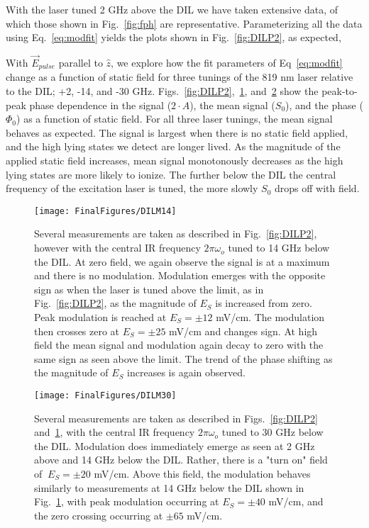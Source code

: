 \documentclass[aps,pra,preprint,groupedaddress]{revtex4-1}
\begin{document}
With the laser tuned 2 GHz above the DIL we have taken extensive data, of which those shown in Fig.~\ref{fig:fph} are representative. Parameterizing all the data using Eq.~\ref{eq:modfit} yields the plots shown in Fig.~\ref{fig:DILP2}, as expected, 

With $\vec{E}_{pulse}$ parallel to $\hat{z}$, we explore how the fit parameters of Eq~\ref{eq:modfit} change as a function of static field for three tunings of the 819 nm laser relative to the DIL; +2, -14, and -30 GHz. Figs.~\ref{fig:DILP2},~\ref{fig:DILM14}, and~\ref{fig:DILM30} show the peak-to-peak phase dependence in the signal ($2\cdot A$), the mean signal ($S_0$), and the phase ($\Phi_0$) as a function of static field. For all three laser tunings, the mean signal behaves as expected. The signal is largest when there is no static field applied, and the high lying states we detect are longer lived. As the magnitude of the applied static field increases, mean signal monotonously decreases as the high lying states are more likely to ionize. The further below the DIL the central frequency of the excitation laser is tuned, the more slowly $S_0$ drops off with field.

\begin{figure}
	\texttt{[image: FinalFigures/DILM14]}
	\caption{Several measurements are taken as described in Fig.~\ref{fig:DILP2}, however with the central IR frequency $2\pi\omega_o$ tuned to 14 GHz below the DIL. At zero field, we again observe the signal is at a maximum and there is no modulation. Modulation emerges with the opposite sign as when the laser is tuned above the limit, as in Fig.~\ref{fig:DILP2}, as the magnitude of $E_S$ is increased from zero. Peak modulation is reached at $E_S = \pm 12$ mV/cm. The modulation then crosses zero at $E_S = \pm 25$ mV/cm and changes sign. At high field the mean signal and modulation again decay to zero with the same sign as seen above the limit. The trend of the phase shifting as the magnitude of $E_S$ increases is again observed.}
	\label{fig:DILM14}
\end{figure}

\begin{figure}
	\texttt{[image: FinalFigures/DILM30]}
	\caption{Several measurements are taken as described in Figs.~\ref{fig:DILP2} and~\ref{fig:DILM14}, with the central IR frequency $2\pi\omega_o$ tuned to 30 GHz below the DIL. Modulation does immediately emerge as seen at 2 GHz above and 14 GHz below the DIL. Rather, there is a "turn on" field of $~ E_S = \pm 20$ mV/cm. Above this field, the modulation behaves similarly to measurements at 14 GHz below the DIL shown in Fig.~\ref{fig:DILM14}, with peak modulation occurring at $E_S = \pm 40$ mV/cm, and the zero crossing occurring at $\pm 65$ mV/cm.}
	\label{fig:DILM30}
\end{figure}
\end{document}

